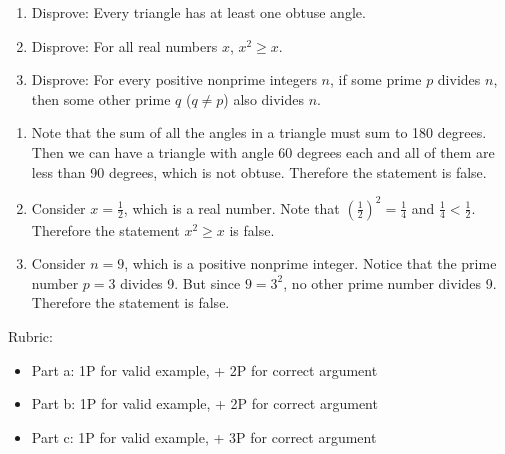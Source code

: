 \documentclass{article}
\theoremstyle{definition}
\begin{document}
\begin{question}
    \begin{enumerate}
        \item Disprove: Every triangle has at least one obtuse angle.
        \item Disprove: For all real numbers $x$, $x^2\geq x$.
        \item Disprove: For every positive nonprime integers $n$, if some prime $p$ divides $n$, 
            then some other prime $q$ ($q\neq p$) also divides $n$.
    \end{enumerate}
\end{question}
\begin{solution}
\begin{enumerate}
\item Note that the sum of all the angles in a triangle must sum to 180 degrees. Then we can have a triangle with angle 60 degrees each and all of them are less than 90 degrees, which is not obtuse. Therefore the statement is false.

\item Consider $x=\frac{1}{2}$, which is a real number. Note that $\left(\frac{1}{2}\right)^2=\frac{1}{4}$ and $\frac{1}{4}< \frac{1}{2}$. Therefore the statement $x^2\geq x$ is false.

\item Consider $n=9$, which is a positive nonprime integer. Notice that the prime number $p=3$ divides 9. But since $9=3^2$, no other prime number divides 9. Therefore the statement is false.
\end{enumerate}
{\color{red} Rubric:
\begin{itemize}
\item Part a: 1P for valid example, + 2P for correct argument
\item Part b: 1P for valid example, + 2P for correct argument
\item Part c: 1P for valid example, + 3P for correct argument
\end{itemize}}
\end{solution}
\end{document}
